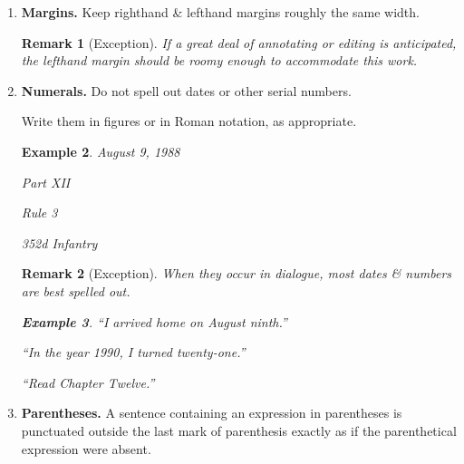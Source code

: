 \documentclass{article}
\newtheorem{example}{Example}
\newtheorem{remark}{Remark}
\begin{document}
\begin{enumerate}
	The steady evolution of the language seems to favor union: 2 words eventually become one, usually after a period of hyphenation.
	\begin{example}
		bed chamber $\to$ bed-chamber $\to$ bedchamber
		
		wild life $\to$ wild-life $\to$ wildlife
		
		bell boy $\to$ bell-boy $\to$ bellboy
	\end{example}
	The hyphen can play tricks on the unwary, as it did it Chattanooga when 2 newspapers merged - the {\it News} \& the {\it Free Press}.
	
	Someone introduced a hyphen into the merger, \& the paper became {\it The Chattanooga News-Free Press}, which sounds as though the paper were news-free, or devoid of news.
	
	Obviously, we ask too much of a hyphen when we ask it to cast its spell over words it does not adjoint.
	\item {\bf Margins.} Keep righthand \& lefthand margins roughly the same width.
	
	\begin{remark}[Exception]
		If a great deal of annotating or editing is anticipated, the lefthand margin should be roomy enough to accommodate this work.
	\end{remark}
	\item {\bf Numerals.} Do not spell out dates or other serial numbers.
	
	Write them in figures or in Roman notation, as appropriate.
	\begin{example}
		August 9, 1988
		
		Part XII
		
		Rule 3
		
		352d Infantry
	\end{example}
	
	\begin{remark}[Exception]
		When they occur in dialogue, most dates \& numbers are best spelled out.
		\begin{example}
			``I arrived home on August ninth.''
			
			``In the year 1990, I turned twenty-one.''
			
			``Read Chapter Twelve.''
		\end{example}
	\end{remark}
	\item {\bf Parentheses.} A sentence containing an expression in parentheses is punctuated outside the last mark of parenthesis exactly as if the parenthetical expression were absent.
	

\end{enumerate}
\end{document}
